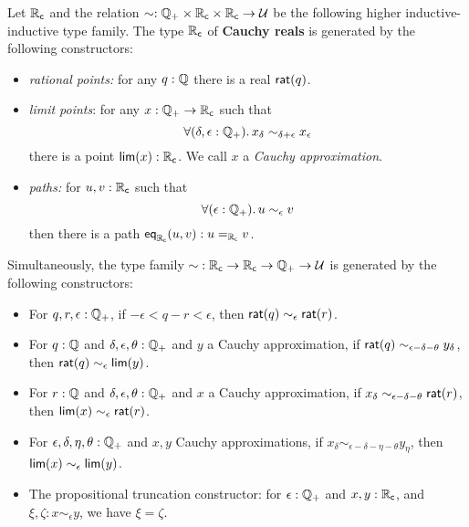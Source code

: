\begin{defn}\label{defn:cauchy-reals}
  Let $\RC$ and the relation $\sim:\Qp \times \RC \times \RC \to \type$ be the following higher inductive-inductive type family.
  The type $\RC$ of \textbf{Cauchy reals} is generated by the following constructors:
  \begin{itemize}
  \item \emph{rational points:} 
    for any $q : \Q$ there is a real $\rcrat(q)$.
  \item \emph{limit points}:
    for any $x : \Qp \to \RC$ such that
    \begin{equation}
      \label{eq:RC-cauchy}
      \fall{\delta, \epsilon : \Qp} x_\delta \sim_{\delta + \epsilon} x_\epsilon
    \end{equation}
    there is a point $\rclim(x) : \RC$. We call $x$ a \emph{Cauchy approximation}.
  \item \emph{paths:}
    for $u, v : \RC$ such that
    \begin{equation}
      \label{eq:RC-path}
      \fall{\epsilon : \Qp} u \sim_\epsilon v
    \end{equation}
    then there is a path $\rceq(u, v) : \id[\RC]{u}{v}$.
  \end{itemize}
  Simultaneously, the type family $\mathord\sim:\RC\to\RC\to\Qp \to\type$ is generated by the following constructors:
  \begin{itemize}
  \item For $q,r,\epsilon:\Qp$, if $-\epsilon < q - r < \epsilon$, then $\rcrat(q) \sim_\epsilon \rcrat(r)$.
  \item For $q:\Q$ and $\delta,\epsilon,\theta:\Qp$ and $y$ a Cauchy approximation, if $\rcrat(q) \sim_{\epsilon - \delta - \theta} y_\delta$, then $\rcrat(q) \sim_{\epsilon} \rclim(y)$.
  \item For $r:\Q$ and $\delta,\epsilon,\theta:\Qp$ and $x$ a Cauchy approximation, if $x_\delta \sim_{\epsilon - \delta - \theta} \rcrat(r)$, then $\rclim(x) \sim_\epsilon \rcrat(r)$.
  \item For $\epsilon,\delta,\eta,\theta:\Qp$ and $x,y$ Cauchy approximations, if $x_\delta \sim_{\epsilon - \delta - \eta - \theta} y_\eta$, then $\rclim(x) \sim_\epsilon \rclim(y)$.
  \item The propositional truncation constructor: for $\epsilon:\Qp$ and $x,y:\RC$, and $\xi,\zeta:x\sim_{\epsilon} y$, we have $\xi=\zeta$.
  \end{itemize}
\end{defn}

